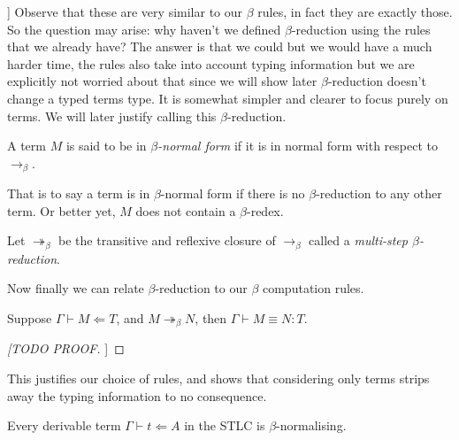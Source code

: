 \begin{remark}[[Clear up wording]]
    Observe that these are very similar to our $\beta$ rules, in fact they are exactly those. So the question may arise: why haven't we defined $\beta$-reduction using the rules that we already have? The answer is that we could but we would have a much harder time, the rules also take into account typing information but we are explicitly not worried about that since we will show later $\beta$-reduction doesn't change a typed terms type. It is somewhat simpler and clearer to focus purely on terms. We will later justify calling this $\beta$-reduction.
\end{remark}

\begin{defin}
    A term $M$ is said to be in \emph{$\beta$-normal form} if it is in normal form with respect to $\to_\beta$.
\end{defin}

\begin{remark}
    That is to say a term is in $\beta$-normal form if there is no $\beta$-reduction to any other term. Or better yet, $M$ does not contain a $\beta$-redex.
\end{remark}

\begin{defin}
    Let $\twoheadrightarrow_{\beta}$ be the transitive and reflexive closure of $\to_{\beta}$ called a \emph{multi-step $\beta$-reduction}.
\end{defin}

Now finally we can relate $\beta$-reduction to our $\beta$ computation rules.

\begin{lemma}
    Suppose $\Gamma \vdash M \Leftarrow T$, and $M \twoheadrightarrow_{\beta} N$, then $\Gamma \vdash M \equiv N : T$.
\end{lemma}

\begin{proof}
[[TODO PROOF]]
\end{proof}

\begin{remark}
    This justifies our choice of rules, and shows that considering only terms strips away the typing information to no consequence.
\end{remark}

\begin{theorem}
    Every derivable term $\Gamma \vdash t \Leftarrow A$ in the STLC is $\beta$-normalising.
\end{theorem}

